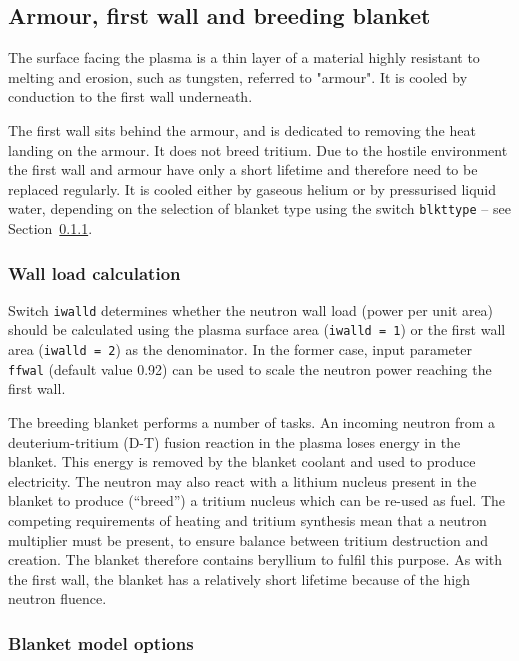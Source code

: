 \documentclass[11pt,a4paper]{report}
\begin{document}
\subsection{Armour, first wall and breeding blanket}
The surface facing the plasma is a thin layer of a material highly resistant to melting and erosion, such as tungsten, referred to "armour".  It is cooled by conduction to the first wall underneath.

The first wall sits behind the armour, and is dedicated to removing the heat landing on the armour.  It does not breed tritium.  Due to the hostile environment the first wall and armour have only a short lifetime and therefore need to be replaced regularly. It is cooled either by gaseous helium or by pressurised liquid water, depending on the selection of blanket type using the switch \texttt{blkttype}  -- see Section~\ref{sec:blanket_switches}.

\subsubsection*{Wall load calculation}

Switch \texttt{iwalld} determines whether the neutron wall load (power per
unit area) should be calculated using the plasma surface area (\texttt{iwalld
  = 1}) or the first wall area (\texttt{iwalld = 2}) as the denominator. In
the former case, input parameter \texttt{ffwal} (default value 0.92)
can be used to scale the neutron power reaching the first wall.

The breeding blanket performs a number of tasks. An incoming neutron from a
deuterium-tritium (D-T) fusion reaction in the plasma loses energy in the
blanket. This energy is removed by the blanket coolant and used to produce
electricity. The neutron may also react with a lithium nucleus present in the
blanket to produce (``breed'') a tritium nucleus which can be re-used as
fuel. The competing requirements of heating and tritium synthesis mean that a
neutron multiplier must be present, to ensure balance between tritium
destruction and creation. The blanket therefore contains beryllium to fulfil
this purpose. As with the first wall, the blanket has a relatively short
lifetime because of the high neutron fluence.

\subsubsection{Blanket model options}
\label{sec:blanket_switches}
\end{document}
